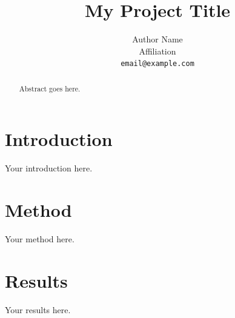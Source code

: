 \documentclass{article}
\title{My Project Title}
\author{
    Author Name \\
    Affiliation \\
    \texttt{email@example.com}
}
\begin{document}
\maketitle

\begin{abstract}
    Abstract goes here.
\end{abstract}

\section{Introduction}

Your introduction here.

\section{Method}

Your method here.

\section{Results}

Your results here.



\end{document}
